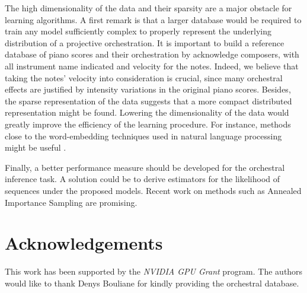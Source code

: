\documentclass[letterpaper]{article}
\begin{document}
The high dimensionality of the data and their sparsity are a major obstacle for learning algorithms.
A first remark is that a larger database would be required to train any model sufficiently complex to properly represent the underlying distribution of a projective orchestration.
It is important to build a reference database of piano scores and their orchestration by acknowledge composers, with all instrument name indicated and velocity for the notes. 
Indeed, we believe that taking the notes' velocity into consideration is crucial, since many orchestral effects are justified by intensity variations in the original piano scores. 
Besides, the sparse representation of the data suggests that a more compact distributed representation might be found. Lowering the dimensionality of the data would greatly improve the efficiency of the learning procedure. For instance, methods close to the word-embedding techniques used in natural language processing might be useful \cite{kiros2015skip}.

Finally, a better performance measure should be developed for the orchestral inference task. A solution could be to derive estimators for the likelihood of sequences under the proposed models. Recent work on methods such as Annealed Importance Sampling are promising.

\section{Acknowledgements}
This work has been supported by the \textit{NVIDIA GPU Grant} program.
The authors would like to thank Denys Bouliane for kindly providing the orchestral database.


\end{document}
